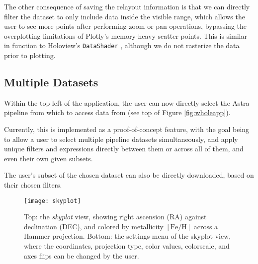 \documentclass[a4paper,10pt,twocolumn]{article}
\begin{document}
The other consequence of saving the relayout information is that we can directly filter the dataset to only include data inside the visible range, which allows the user to see more points after performing zoom or pan operations, bypassing the overplotting limitations of Plotly's memory-heavy scatter points. This is similar in function to Holoview's \texttt{DataShader} \parencite{holoviews}, although we do not rasterize the data prior to plotting.

\subsection{Multiple Datasets}
\label{sec:datasets}
Within the top left of the application, the user can now directly select the Astra pipeline from which to access data from (see top of Figure \ref{fig:wholeapp}).

Currently, this is implemented as a proof-of-concept feature, with the goal being to allow a user to select multiple pipeline datasets simultaneously, and apply unique filters and expressions directly between them or across all of them, and even their own given subsets.

The user's subset of the chosen dataset can also be directly downloaded, based on their chosen filters.
\begin{figure}[tp]
	\centering
	\texttt{[image: skyplot]}
	\caption{Top: the \emph{skyplot} view, showing right ascension (RA) against declination (DEC), and colored by metallicity $\mathrm{[Fe / H]}$ across a Hammer projection. Bottom: the settings menu of the skyplot view, where the coordinates, projection type, color values, colorscale, and axes flips can be changed by the user.}
	\label{fig:skyplot}
\end{figure}
\end{document}
